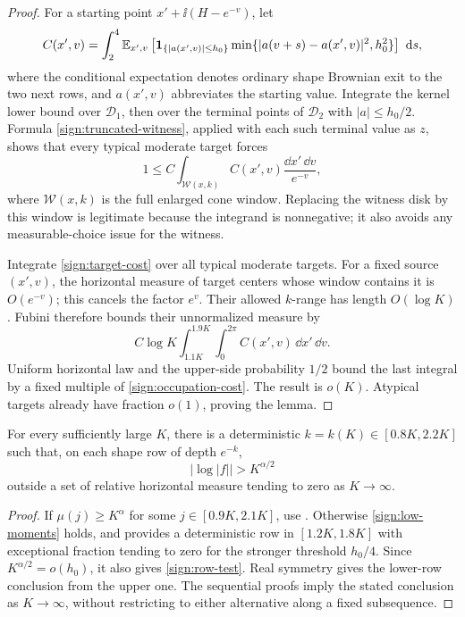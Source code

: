 \begin{proof}
For a starting point \(x'+\ii(H-e^{-v})\), let
\[
 C(x',v)=\int_2^4\mathbb E_{x',v}\left[
 \mathbf 1_{\{|a(x',v)|\le h_0\}}
 \min\{|a(v+s)-a(x',v)|^2,h_0^2\}\right]\,\,\mathrm d s,
\]
where the conditional expectation denotes ordinary shape Brownian
exit to the two next rows, and \(a(x',v)\) abbreviates the starting
value.  Integrate the kernel lower bound over \(\mathcal D_1\),
then over the terminal points of \(\mathcal D_2\) with
\(|a|\le h_0/2\).  Formula \eqref{sign:truncated-witness}, applied
with each such terminal value as \(z\), shows that every typical
moderate target forces
\begin{equation}\label{sign:target-cost}
 1\le C\int_{\mathcal W(x,k)}C(x',v)
                     \frac{\dd x'\,\dd v}{e^{-v}},
\end{equation}
where \(\mathcal W(x,k)\) is the full enlarged cone window.
Replacing the witness disk by this window is legitimate because the
integrand is nonnegative; it also avoids any measurable-choice issue
for the witness.

Integrate \eqref{sign:target-cost} over all typical moderate targets.
For a fixed source \((x',v)\), the horizontal measure of target
centers whose window contains it is \(O(e^{-v})\); this cancels the
factor \(e^v\).  Their allowed \(k\)-range has length
\(O(\log K)\).  Fubini therefore bounds their unnormalized measure
by
\[
 C\log K\int_{1.1K}^{1.9K}\int_0^{2\pi}C(x',v)\,\dd x'\,\dd v.
\]
Uniform horizontal law and the upper-side probability \(1/2\)
bound the last integral by a fixed multiple of
\eqref{sign:occupation-cost}.  The result is \(o(K)\).  Atypical
targets already have fraction \(o(1)\), proving the lemma.
\end{proof}

\begin{theorem}\label{thm:row-sign}
For every sufficiently large \(K\), there is a deterministic
\(k=k(K)\in[0.8K,2.2K]\) such that, on each shape row of depth
\(e^{-k}\),
\begin{equation}\label{sign:row-test}
 |\log|f||>K^{\alpha/2}
\end{equation}
outside a set of relative horizontal measure tending to zero as
\(K\to\infty\).
\end{theorem}

\begin{proof}
If \(\mu(j)\ge K^\alpha\) for some
\(j\in[0.9K,2.1K]\), use .  Otherwise
\eqref{sign:low-moments} holds, and
 provides a deterministic row in
\([1.2K,1.8K]\) with exceptional fraction tending to zero for the
stronger threshold \(h_0/4\).  Since
\(K^{\alpha/2}=o(h_0)\), it also gives \eqref{sign:row-test}.
Real symmetry gives the lower-row conclusion from the upper one.
The sequential proofs imply the stated conclusion as \(K\to\infty\),
without restricting to either alternative along a fixed subsequence.
\end{proof}

